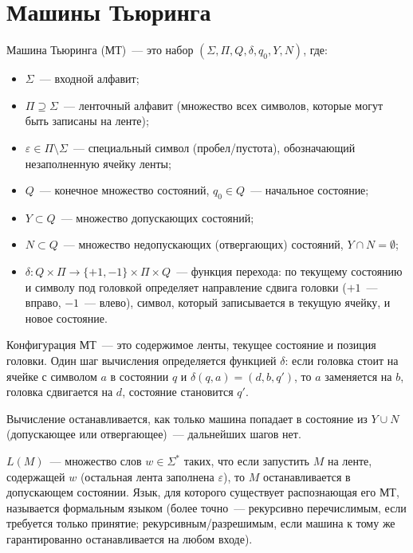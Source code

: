 \documentclass[12pt]{article}
\begin{document}
    \section{Машины Тьюринга}
    
    \begin{definition}
    	Машина Тьюринга (МТ)~--- это набор $(\Sigma, \Pi, Q, \delta, q_0, Y, N)$, где:
    	\begin{itemize}
    		\item $\Sigma$~--- входной алфавит;
    		\item $\Pi \supseteq \Sigma$~--- ленточный алфавит (множество всех символов, которые могут быть записаны на ленте);
    		\item $\varepsilon \in \Pi \setminus \Sigma$~--- специальный символ (пробел/пустота), обозначающий незаполненную ячейку ленты;
    		\item $Q$~--- конечное множество состояний, $q_0 \in Q$~--- начальное состояние;
    		\item $Y \subset Q$~--- множество допускающих состояний;
    		\item $N \subset Q$~--- множество недопускающих (отвергающих) состояний, $Y \cap N = \emptyset$;
    		\item $\delta: Q \times \Pi \rightarrow \{+1,-1\} \times \Pi \times Q$~--- функция перехода: по текущему состоянию и символу под головкой определяет направление сдвига головки ($+1$~--- вправо, $-1$~--- влево), символ, который записывается в текущую ячейку, и новое состояние.
    	\end{itemize}
    \end{definition}
    
    \begin{definition}
    	Конфигурация МТ~--- это содержимое ленты, текущее состояние и позиция головки. Один шаг вычисления определяется функцией $\delta$: если головка стоит на ячейке с символом $a$ в состоянии $q$ и $\delta(q, a) = (d, b, q')$, то $a$ заменяется на $b$, головка сдвигается на $d$, состояние становится $q'$.
    	
    	Вычисление останавливается, как только машина попадает в состояние из $Y \cup N$ (допускающее или отвергающее)~--- дальнейших шагов нет.
    \end{definition}
    
    \begin{definition}
    	$L(M)$~--- множество слов $w \in \Sigma^*$ таких, что если запустить $M$ на ленте, содержащей $w$ (остальная лента заполнена $\varepsilon$), то $M$ останавливается в допускающем состоянии. Язык, для которого существует распознающая его МТ, называется формальным языком (более точно~--- рекурсивно перечислимым, если требуется только принятие; рекурсивным/разрешимым, если машина к тому же гарантированно останавливается на любом входе).
    \end{definition}
    
\end{document}
